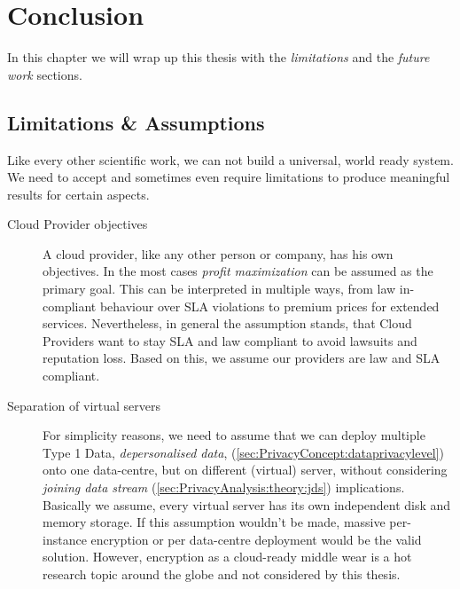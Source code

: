 
\chapter{Conclusion}
\label{ch:Conclusion}

In this chapter we will wrap up this thesis with the \textit{limitations} and the \textit{future work} sections.

\section{Limitations \& Assumptions}
\label{sec:Conculsion:limits}

Like every other scientific work, we can not build a universal, world ready system. We need to accept and sometimes even require limitations to produce meaningful results for certain aspects.

\begin{description}
	\item[Cloud Provider objectives]
	A cloud provider, like any other person or company, has his own objectives. In the most cases \textit{profit maximization} can be assumed as the primary goal. This can be interpreted in multiple ways, from law in-compliant behaviour over SLA violations to premium prices for extended services. Nevertheless, in general the assumption stands, that Cloud Providers want to stay SLA and law compliant to avoid lawsuits and reputation loss. Based on this, we assume our providers are law and SLA compliant.
\end{description}	


\begin{description}
	\item[Separation of virtual servers]
	For simplicity reasons, we need to assume that we can deploy multiple Type 1 Data, \textit{depersonalised data}, (\autoref{sec:PrivacyConcept:dataprivacylevel}) onto one data-centre, but on different (virtual) server, without considering \textit{joining data stream} (\autoref{sec:PrivacyAnalysis:theory:jds}) implications. Basically we assume, every virtual server has its own independent disk and memory storage.	If this assumption wouldn’t be made, massive per-instance encryption or per data-centre deployment would be the valid solution. However, encryption as a cloud-ready middle wear is a hot research topic around the globe and not considered by this thesis.
\end{description}

